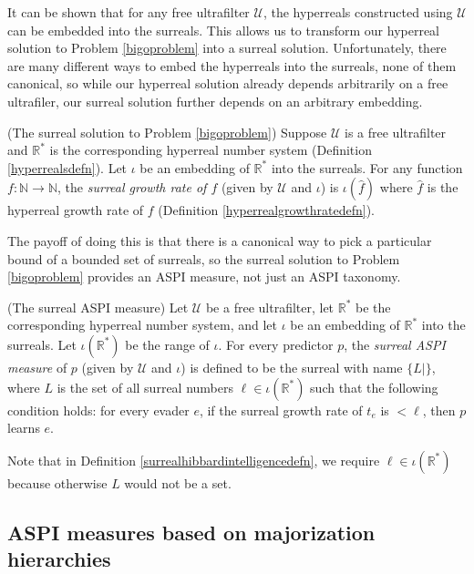 \documentclass[twoside,11pt]{article}
\begin{document}
It can be shown that for any free ultrafilter $\mathcal U$, the hyperreals constructed using
$\mathcal U$ can be embedded into the surreals. This allows us to transform our hyperreal
solution to Problem \ref{bigoproblem} into a surreal solution.
Unfortunately, there are many different ways to embed the hyperreals into the surreals,
none of them canonical, so while our hyperreal solution already depends arbitrarily on
a free ultrafiler, our surreal solution further depends on an arbitrary embedding.

\begin{definition}
    (The surreal solution to Problem \ref{bigoproblem})
    Suppose $\mathcal U$ is a free ultrafilter and $\mathbb R^*$ is the corresponding
    hyperreal number system (Definition \ref{hyperrealsdefn}).
    Let $\iota$ be an embedding of $\mathbb R^*$ into the surreals.
    For any function $f:\mathbb N\to\mathbb N$, the \emph{surreal growth rate
    of $f$} (given by $\mathcal U$ and $\iota$) is
    $\iota(\hat f)$ where $\hat f$ is the hyperreal growth
    rate of $f$ (Definition \ref{hyperrealgrowthratedefn}).
\end{definition}

The payoff of doing this is that there is a canonical way to pick a particular
bound of a bounded set of surreals, so the surreal solution to Problem \ref{bigoproblem}
provides an ASPI measure, not just an ASPI taxonomy.

\begin{definition}
\label{surrealhibbardintelligencedefn}
    (The surreal ASPI measure)
    Let $\mathcal U$ be a free ultrafilter, let $\mathbb R^*$ be the corresponding
    hyperreal number system, and let $\iota$ be an embedding of $\mathbb R^*$
    into the surreals. Let $\iota(\mathbb R^*)$ be the range of $\iota$.
    For every predictor $p$, the \emph{surreal ASPI measure} of $p$
    (given by $\mathcal U$ and $\iota$)
    is defined to be the surreal with name $\{L|\}$,
    where $L$ is the set of all surreal numbers $\ell\in\iota(\mathbb R^*)$ such that
    the following condition holds: for every evader $e$,
    if the surreal growth rate of $t_e$ is $<\ell$, then $p$ learns $e$.
\end{definition}

Note that in Definition \ref{surrealhibbardintelligencedefn}, we require
$\ell\in\iota(\mathbb R^*)$ because otherwise $L$ would not be a set.

\subsection{ASPI measures based on majorization hierarchies}
\end{document}
